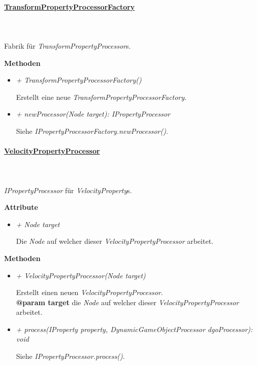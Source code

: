     \paragraph{\underline{TransformPropertyProcessorFactory}} \mbox{}\\
    \\
    Fabrik für \textit{TransformPropertyProcessor}s.\par

        \textbf{Methoden}
        \begin{itemize}
            \item \textit{+ TransformPropertyProcessorFactory()}
                \begin{leftbar}[0.9\linewidth]
                    Erstellt eine neue \textit{TransformPropertyProcessorFactory}.
                \end{leftbar}
            \item \textit{+ newProcessor(Node target): IPropertyProcessor}
                \begin{leftbar}[0.9\linewidth]
                    Siehe \textit{IPropertyProcessorFactory.newProcessor()}.
                \end{leftbar}
        \end{itemize}

    \paragraph{\underline{VelocityPropertyProcessor}} \mbox{}\\
    \\
    \textit{IPropertyProcessor} für \textit{VelocityProperty}s.\par

        \textbf{Attribute}
        \begin{itemize}
            \item \textit{+ Node target}
                \begin{leftbar}[0.9\linewidth]
                    Die \textit{Node} auf welcher dieser \textit{VelocityPropertyProcessor} arbeitet.
                \end{leftbar}
        \end{itemize}
        \textbf{Methoden}
        \begin{itemize}
            \item \textit{+ VelocityPropertyProcessor(Node target)}
                \begin{leftbar}[0.9\linewidth]
                    Erstellt einen neuen \textit{VelocityPropertyProcessor}.\\
                    \textbf{@param target} die \textit{Node} auf welcher dieser \textit{VelocityPropertyProcessor} arbeitet.
                \end{leftbar}
            \item \textit{+ process(IProperty property, DynamicGameObjectProcessor dgoProcessor): void}
                \begin{leftbar}[0.9\linewidth]
                    Siehe \textit{IPropertyProcessor.process()}.
                \end{leftbar}
        \end{itemize}

